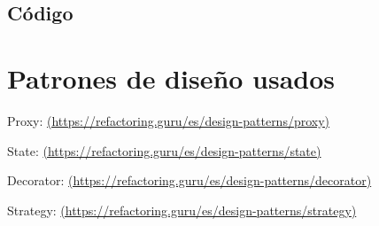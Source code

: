 \documentclass[11pt,a4paper]{article}
\begin{document}
\subsection{Código}



















\section{Patrones de diseño usados}

Proxy: \url{(https://refactoring.guru/es/design-patterns/proxy)}

State: \url{(https://refactoring.guru/es/design-patterns/state)}

Decorator: \url{(https://refactoring.guru/es/design-patterns/decorator)}

Strategy: \url{(https://refactoring.guru/es/design-patterns/strategy)}
\end{document}
